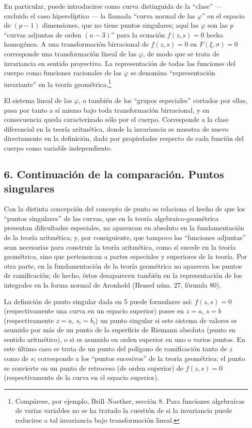 \documentclass[11pt]{article}
\begin{document}
En particular, puede introducirse como curva distinguida de la ``clase'' --- excluido el caso hiperelíptico --- la llamada ``curva normal de las \(\varphi\)'' en el espacio de \((p-1)\) dimensiones, que no tiene puntos singulares; aquí las \(\varphi\) son las \(p\) ``curvas adjuntas de orden \((n-3)\)'' para la ecuación \(f(z,s)=0\) hecha homogénea. A una transformación birracional de \(f(z,s)=0\) en \(F(\xi,\sigma)=0\) corresponde una transformación lineal de las \(\varphi\), de modo que se trata de invariancia en sentido proyectivo. La representación de todas las funciones del cuerpo como funciones racionales de las \(\varphi\) se denomina ``representación invariante'' en la teoría geométrica.\footnote{Compárese, por ejemplo, Brill--Noether, sección 8. Para funciones algebraicas de varias variables no se ha tratado la cuestión de si la invariancia puede reducirse a tal invariancia bajo transformación lineal.}

El sistema lineal de las \(\varphi\), o también de los ``grupos especiales'' cortados por ellas, pasa por tanto a sí mismo bajo toda transformación birracional, y en consecuencia queda caracterizado sólo por el cuerpo. Corresponde a la clase diferencial en la teoría aritmética, donde la invariancia se muestra de nuevo directamente en la definición, dada por propiedades respecto de cada función del cuerpo como variable independiente.

\subsection*{6. Continuación de la comparación. Puntos singulares}
Con la distinta concepción del concepto de punto se relaciona el hecho de que los ``puntos singulares'' de las curvas, que en la teoría algebraico-geométrica presentan dificultades especiales, no aparezcan en absoluto en la fundamentación de la teoría aritmética; y, por consiguiente, que tampoco las ``funciones adjuntas'' sean necesarias para construir la teoría aritmética, como sí sucede en la teoría geométrica, sino que pertenezcan a partes especiales y superiores de la teoría. Por otra parte, en la fundamentación de la teoría geométrica no aparecen los puntos de ramificación; de hecho, éstos desaparecen también en la representación de los integrales en la forma normal de Aronhold (Hensel núm. 27, fórmula 80).

La definición de punto singular dada en 5 puede formularse así: \(f(z,s)=0\) (respectivamente una curva en un espacio superior) posee en \(z=a\), \(s=b\) (respectivamente \(z=a\), \(s_i=b_i\)) un punto singular si este sistema de valores es asumido por más de un punto de la superficie de Riemann absoluta (punto en sentido aritmético), o si es asumido en orden superior en uno o varios puntos. En este último caso se trata de un punto del polígono de ramificación tanto de \(z\) como de \(s\); corresponde a los ``puntos sucesivos'' de la teoría geométrica; el punto se convierte en un punto de retroceso (de orden superior) de \(f(z,s)=0\) (respectivamente de la curva en el espacio superior).
\end{document}
